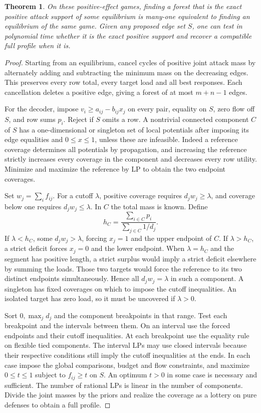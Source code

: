 \documentclass[11pt,oneside,openany,notitlepage]{report}
\newtheorem{theorem}{Theorem}[chapter]
\begin{document}
\begin{theorem}\label{thm:givenforest}
On these positive-effect games, finding a forest that is the exact
positive attack support of some equilibrium is many-one equivalent to
finding an equilibrium of the same game. Given any proposed edge set
\(S\), one can test in polynomial time whether it is the exact positive
support and recover a compatible full profile when it is.
\end{theorem}
\begin{proof}
Starting from an equilibrium, cancel cycles of positive joint attack
mass by alternately adding and subtracting the minimum mass on the
decreasing edges. This preserves every row total, every target load and
all best responses. Each cancellation deletes a positive edge, giving a
forest of at most \(m+n-1\) edges.

For the decoder, impose \(v_i\ge a_{ij}-b_{ij}x_j\) on every pair,
equality on \(S\), zero flow off \(S\), and row sums \(p_i\). Reject
if \(S\) omits a row. A nontrivial connected component \(C\) of \(S\)
has a one-dimensional or singleton set of local potentials after imposing
its edge equalities and \(0\le x\le1\), unless these are infeasible.
Indeed a reference coverage determines all potentials by propagation,
and increasing the reference strictly increases every coverage in the
component and decreases every row utility. Minimize and maximize the
reference by LP to obtain the two endpoint coverages.

Set \(w_j=\sum_i f_{ij}\). For a cutoff \(\lambda\), positive coverage
requires \(d_jw_j\ge\lambda\), and coverage below one requires
\(d_jw_j\le\lambda\). In \(C\) the total mass is known. Define
\[
 h_C=\frac{\sum_{i\in C}p_i}{\sum_{j\in C}1/d_j}.
\]
If \(\lambda<h_C\), some \(d_jw_j>\lambda\), forcing \(x_j=1\) and the
upper endpoint of \(C\). If \(\lambda>h_C\), a strict deficit forces
\(x_j=0\) and the lower endpoint. When \(\lambda=h_C\) and the segment
has positive length, a strict surplus would imply a strict deficit
elsewhere by summing the loads. Those two targets would force the
reference to its two distinct endpoints simultaneously. Hence all
\(d_jw_j=\lambda\) in such a component. A singleton has fixed coverages
on which to impose the cutoff inequalities. An isolated target has zero
load, so it must be uncovered if \(\lambda>0\).

Sort \(0,\max_jd_j\) and the component breakpoints in that range. Test
each breakpoint and the intervals between them. On an interval use the
forced endpoints and their cutoff inequalities. At each breakpoint use
the equality rule on flexible tied components. The interval LPs may use
closed intervals because their respective conditions still imply the
cutoff inequalities at the ends. In each case impose the global
comparisons, budget and flow constraints, and maximize \(0\le t\le1\)
subject to \(f_{ij}\ge t\) on \(S\). An optimum \(t>0\) in some case
is necessary and sufficient. The number of rational LPs is linear in the
number of components. Divide the joint masses by the priors and realize
the coverage as a lottery on pure defenses to obtain a full profile.
\end{proof}
\end{document}
